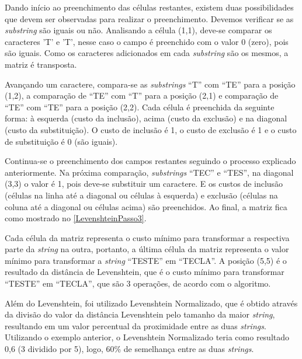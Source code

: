 Dando início ao preenchimento das células restantes, existem duas possibilidades que devem ser observadas para realizar o preenchimento. Devemos verificar se as  \textit{substring} são iguais ou não. Analisando a célula (1,1), deve-se comparar os caracteres 'T' e 'T', nesse caso o campo é preenchido com o valor 0 (zero), pois são iguais. Como os caracteres adicionados em cada \textit{substring} são os mesmos, a matriz é transposta. %

Avançando um caractere, compara-se as \textit{substrings} ``T'' com ``TE'' para a posição (1,2), a comparação de ``TE'' com ``T'' para a posição (2,1) e comparação de ``TE'' com ``TE'' para a posição (2,2). Cada célula é preenchida da seguinte forma: à esquerda (custo da inclusão), acima (custo da exclusão) e na diagonal (custo da substituição). O custo de inclusão é 1, o custo de exclusão é 1 e o custo de substituição é 0 (são iguais).



Continua-se o preenchimento dos campos restantes seguindo o processo explicado anteriormente. Na próxima comparação, \textit{substrings} ``TEC'' e ``TES'', na diagonal (3,3) o valor é 1, pois deve-se substituir um caractere. E os custos de inclusão (células na linha até a diagonal ou células à esquerda) e exclusão (células na coluna até a diagonal ou células acima) são preenchidos. Ao final, a matriz fica como mostrado no  \autoref{LevenshteinPasso3}. 

Cada célula da matriz representa o custo mínimo para transformar a respectiva parte da \textit{string} na outra, portanto, a última célula da matriz representa o valor mínimo para transformar a \textit{string} ``TESTE'' em ``TECLA''. A posição (5,5) é o resultado da distância de  Levenshtein, que é o custo mínimo para transformar ``TESTE'' em ``TECLA'', que são 3 operações, de acordo com o algoritmo.



Além do Levenshtein, foi utilizado Levenshtein Normalizado, que é obtido através da divisão do valor da distância Levenshtein pelo tamanho da maior \textit{string}, resultando em um valor percentual da proximidade entre as duas \textit{strings}. Utilizando o exemplo anterior, o Levenshtein Normalizado teria como resultado 0,6 (3 dividido por 5), logo, 60\% de semelhança entre as duas \textit{strings}.


